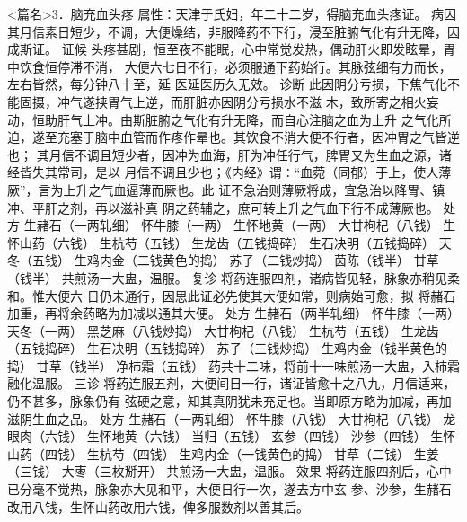 \documentclass[a4paper,12pt,UTF8,twoside]{ctexbook}
\begin{document}
<篇名>3．脑充血头疼
属性：天津于氏妇，年二十二岁，得脑充血头疼证。 
病因 其月信素日短少，不调，大便燥结，非服降药不下行，浸至脏腑气化有升无降，因成斯证。 
证候 头疼甚剧，恒至夜不能眠，心中常觉发热，偶动肝火即发眩晕，胃中饮食恒停滞不消， 
大便六七日不行，必须服通下药始行。其脉弦细有力而长，左右皆然，每分钟八十至，延 
医延医历久无效。 
诊断 此因阴分亏损，下焦气化不能固摄，冲气遂挟胃气上逆，而肝脏亦因阴分亏损水不滋 
木，致所寄之相火妄动，恒助肝气上冲。由斯脏腑之气化有升无降，而自心注脑之血为上升 
之气化所迫，遂至充塞于脑中血管而作疼作晕也。其饮食不消大便不行者，因冲胃之气皆逆也； 
其月信不调且短少者，因冲为血海，肝为冲任行气，脾胃又为生血之源，诸经皆失其常司，是以 
月信不调且少也；《内经》谓∶“血菀（同郁）于上，使人薄厥”，言为上升之气血逼薄而厥也。此 
证不急治则薄厥将成，宜急治以降胃、镇冲、平肝之剂，再以滋补真 
阴之药辅之，庶可转上升之气血下行不成薄厥也。 
处方 生赭石（一两轧细） 怀牛膝（一两） 生怀地黄（一两） 大甘枸杞（八钱） 
生怀山药（六钱） 生杭芍（五钱） 生龙齿（五钱捣碎） 生石决明（五钱捣碎） 
天冬（五钱） 生鸡内金（二钱黄色的捣） 苏子（二钱炒捣） 茵陈（钱半） 甘草（钱半） 
共煎汤一大盅，温服。 
复诊 将药连服四剂，诸病皆见轻，脉象亦稍见柔和。惟大便六 
日仍未通行，因思此证必先使其大便如常，则病始可愈，拟 
将赭石加重，再将余药略为加减以通其大便。 
处方 生赭石（两半轧细） 怀牛膝（一两） 天冬（一两） 黑芝麻（八钱炒捣） 
大甘枸杞（八钱） 生杭芍（五钱） 生龙齿（五钱捣碎） 生石决明（五钱捣碎） 
苏子（三钱炒捣） 生鸡内金（钱半黄色的捣） 甘草（钱半） 净柿霜（五钱） 
药共十二味，将前十一味煎汤一大盅，入柿霜融化温服。 
三诊 将药连服五剂，大便间日一行，诸证皆愈十之八九，月信适来，仍不甚多，脉象仍有 
弦硬之意，知其真阴犹未充足也。当即原方略为加减，再加滋阴生血之品。 
处方 生赭石（一两轧细） 怀牛膝（八钱） 大甘枸杞（八钱） 龙眼肉（六钱） 
生怀地黄（六钱） 当归（五钱） 玄参（四钱） 沙参（四钱） 
生怀山药（四钱） 生杭芍（四钱） 生鸡内金（一钱黄色的捣） 甘草（二钱） 生姜（三钱） 大枣（三枚掰开） 
共煎汤一大盅，温服。 
效果 将药连服四剂后，心中已分毫不觉热，脉象亦大见和平，大便日行一次，遂去方中玄 
参、沙参，生赭石改用八钱，生怀山药改用六钱，俾多服数剂以善其后。 
\end{document}
